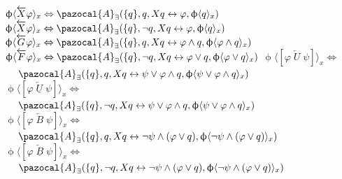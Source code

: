 \documentclass{article}
\newcommand{\Ab}{\pazocal{A}}
\begin{document}
\begin{multicols}{4}
$\upphi \langle \overleftarrow{X} \varphi\rangle_x \Leftrightarrow \Ab_\exists (\{q\},q, Xq \leftrightarrow \varphi, \upphi \langle q \rangle_x)$\\
$\upphi \langle \overleftarrow{X} \varphi\rangle_x \Leftrightarrow \Ab_\exists (\{q\},\neg q, Xq \leftrightarrow \varphi, \upphi \langle q \rangle_x)$\\
$\upphi \langle \overleftarrow{G}\varphi\rangle_x \Leftrightarrow \Ab_\exists (\{q\},q, X q \leftrightarrow \varphi \wedge q,\upphi \langle \varphi \wedge q \rangle_x)$
$\upphi \langle \overleftarrow{F}\varphi\rangle_x \Leftrightarrow \Ab_\exists (\{q\},\neg q, X q \leftrightarrow \varphi \vee q,\upphi \langle \varphi \vee q \rangle_x)$
$\upphi \langle [\varphi \; \overleftarrow{U} \; \psi] \rangle_x \Leftrightarrow$ \\
$\ \ \ \ \Ab_\exists (\{q\},q, X q \leftrightarrow \psi \vee \varphi \wedge q, \upphi \langle \psi \vee \varphi \wedge q \rangle_x)$ \\
$\upphi \langle [\varphi \; \overleftarrow{\underline{U}} \; \psi] \rangle_x \Leftrightarrow$ \\ $\ \ \ \ \Ab_\exists (\{q\},\neg q, X q \leftrightarrow \psi \vee \varphi \wedge q, \upphi \langle \psi \vee \varphi \wedge q \rangle_x)$ \\
$\upphi \langle [\varphi\;\overleftarrow{B} \; \psi] \rangle_x \Leftrightarrow$ \\
$\ \ \ \ \Ab_\exists (\{q\},q, X q \leftrightarrow \neg\psi \wedge (\varphi \vee q), \upphi \langle \neg \psi \wedge (\varphi \vee q) \rangle_x)$ \\
$\upphi \langle [\varphi\;\underline{\overleftarrow{B}} \; \psi] \rangle_x \Leftrightarrow$ \\ $\ \ \ \ \Ab_\exists (\{q\},\neg q, X q \leftrightarrow \neg\psi \wedge (\varphi \vee q), \upphi \langle \neg \psi \wedge (\varphi \vee q) \rangle_x)$ \\


\end{multicols}
\end{document}
